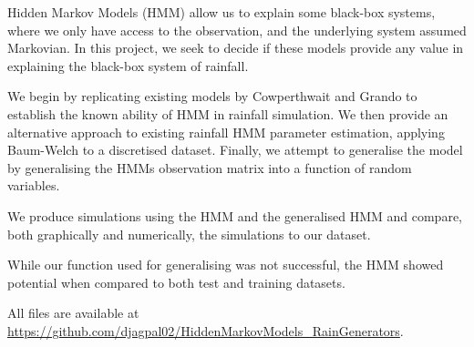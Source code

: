 Hidden Markov Models (HMM) allow us to explain some black-box systems, where we only have access to the observation, and the underlying system assumed Markovian. In this project, we seek to decide if these models provide any value in explaining the black-box system of rainfall.

We begin by replicating existing models by Cowperthwait and Grando to establish the known ability of HMM in rainfall simulation. We then provide an alternative approach to existing rainfall HMM parameter estimation, applying Baum-Welch to a discretised dataset. Finally, we attempt to generalise the model by generalising the HMMs observation matrix into a function of random variables.

We produce simulations using the HMM and the generalised HMM and compare, both graphically and numerically, the simulations to our dataset. 

While our function used for generalising was not successful, the HMM showed potential when compared to both test and training datasets.

All files are available at \href{https://github.com/djagpal02/HiddenMarkovModels_RainGenerators }{https://github.com/djagpal02/HiddenMarkovModels\_RainGenerators}.